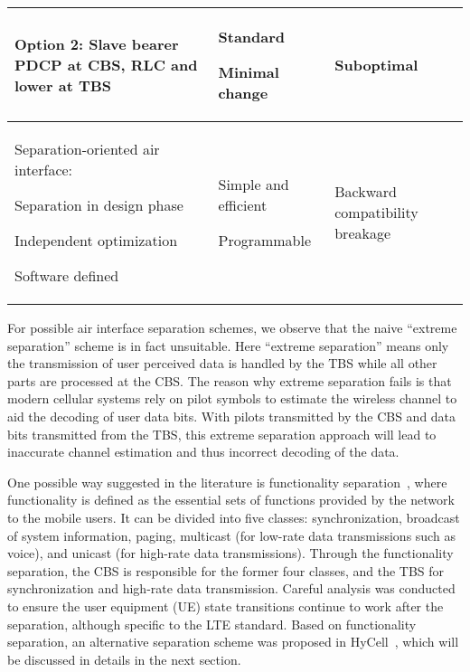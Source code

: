\documentclass[12pt, draftclsnofoot,onecolumn]{IEEEtran}
\makeatletter
\let\savespace\@minipagetrue
\makeatother
\begin{document}
\begin{table}[!t]
\begin{tabularx}{\textwidth}{|X|X|X|}
\begin{compactitem}
\begin{compactitem}
      \item Option 2: Slave bearer PDCP at CBS, RLC  and lower at TBS
      \end{compactitem}
    \end{compactitem}
    & \savespace
    \begin{compactitem}
    \item Standard
    \item Minimal change
    \end{compactitem}
    & Suboptimal \\
    \hline
    \savespace
    Separation-oriented air interface:
    \begin{compactitem}
    \item Separation in design phase
    \item Independent optimization
    \item Software defined
    \end{compactitem}
    & \savespace
    \begin{compactitem}
    \item Simple and efficient
    \item Programmable
    \end{compactitem} &
    Backward compatibility breakage \\
    \hline
  \end{tabularx}
\end{table}


For possible air interface separation schemes, we observe that
the naive ``extreme separation'' scheme is in fact unsuitable.
Here ``extreme separation'' means only the transmission of user perceived data is
handled by the TBS while all other parts are processed at the CBS.
The reason why extreme separation fails is that modern cellular systems rely on
pilot symbols to estimate the wireless channel to aid the decoding of user data
bits. With pilots transmitted by the CBS and data bits transmitted from the TBS, this extreme separation approach will lead to inaccurate
channel estimation and thus incorrect decoding of the data.

One possible way suggested in the literature is functionality
separation~\cite{xu2013functionality}, where functionality is defined as the essential
sets of functions provided by the network to the mobile users.
It can be divided into five classes: synchronization, broadcast of system
information, paging, multicast (for low-rate data transmissions such as voice), and
unicast (for high-rate data transmissions).
Through the functionality separation,
the CBS is responsible for the former four classes, and the TBS for synchronization and high-rate data transmission.
Careful analysis was conducted to ensure the user equipment (UE) state
transitions  continue to work after the separation, although specific to the LTE standard.
Based on functionality separation, an alternative separation scheme was proposed
in HyCell~\cite{zhao2015hycell}, which will be discussed in details in the next section.
\end{document}
